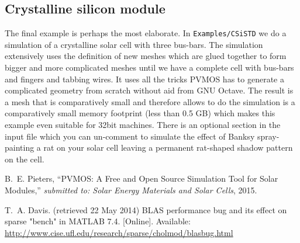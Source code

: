 \documentclass[noshowpacs,preprintnumbers,amsmath,amssymb, letter]{revtex4}
\begin{document}
\subsection{Crystalline silicon module}
The final example is perhaps the most elaborate. In \texttt{Examples/CSiSTD} we do a simulation of a crystalline solar cell with three bus-bars. The simulation extensively uses the definition of new meshes which are glued together to form bigger and more complicated meshes until we have a complete cell with bus-bars and fingers and tabbing wires. It uses all the tricks PVMOS has to generate a complicated geometry from scratch without aid from GNU Octave. The result is a mesh that is comparatively small and therefore allows to do the simulation is a comparatively small memory footprint (less than 0.5 GB) which makes this example even suitable for 32bit machines. There is an optional section in the input file which you can un-comment to simulate the effect of Banksy spray-painting a rat on your solar cell leaving a permanent rat-shaped shadow pattern on the cell. 
\begin{thebibliography}{10}

B.~E. Pieters, ``{PVMOS: A Free and Open Source Simulation Tool for Solar Modules},'' \emph{submitted to: Solar Energy Materials and Solar Cells}, 2015.

T.~A. Davis. (retrieved 22 May 2014) {BLAS performance bug and its effect on
  sparse "bench" in MATLAB 7.4}. [Online]. Available:
  \url{http://www.cise.ufl.edu/research/sparse/cholmod/blasbug.html}
\end{thebibliography}
\end{document}
